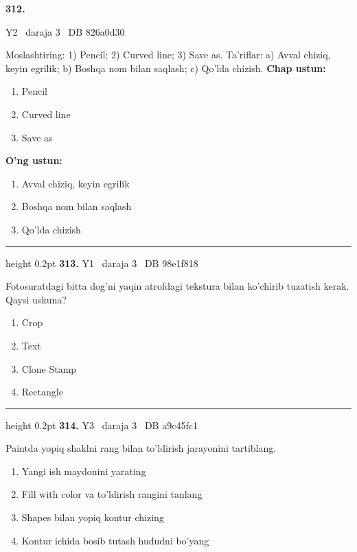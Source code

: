 \documentclass[10pt,a4paper,oneside]{article}
\begin{document}
\hypertarget{q312}{\textbf{\color{ink}312.}}  {\color{muted}\scriptsize Y2 \textbullet\ daraja 3 \textbullet\ DB 826a0d30}
\par
Moslashtiring: 1) Pencil; 2) Curved line; 3) Save as. Ta'riflar: a) Avval chiziq, keyin egrilik; b) Boshqa nom bilan saqlash; c) Qo'lda chizish.
\textbf{\footnotesize Chap ustun:}
\begin{enumerate}[label=\arabic*),leftmargin=9mm]
\item Pencil
\item Curved line
\item Save as
\end{enumerate}
\textbf{\footnotesize O'ng ustun:}
\begin{enumerate}[label=\Alph*),leftmargin=9mm]
\item Avval chiziq, keyin egrilik
\item Boshqa nom bilan saqlash
\item Qo'lda chizish
\end{enumerate}
\vspace{2mm}\hrule height 0.2pt \vspace{4mm}
\hypertarget{q313}{\textbf{\color{ink}313.}}  {\color{muted}\scriptsize Y1 \textbullet\ daraja 3 \textbullet\ DB 98e1f818}
\par
Fotosuratdagi bitta dog'ni yaqin atrofdagi tekstura bilan ko'chirib tuzatish kerak. Qaysi uskuna?
\begin{enumerate}[label=\Alph*),leftmargin=9mm]
\item Crop
\item Text
\item Clone Stamp
\item Rectangle
\end{enumerate}
\vspace{2mm}\hrule height 0.2pt \vspace{4mm}
\hypertarget{q314}{\textbf{\color{ink}314.}}  {\color{muted}\scriptsize Y3 \textbullet\ daraja 3 \textbullet\ DB a9c45fc1}
\par
Paintda yopiq shaklni rang bilan to'ldirish jarayonini tartiblang.
\begin{enumerate}[label=\Alph*),leftmargin=9mm]
\item Yangi ish maydonini yarating
\item Fill with color va to'ldirish rangini tanlang
\item Shapes bilan yopiq kontur chizing
\item Kontur ichida bosib tutash hududni bo'yang
\end{enumerate}
\end{document}
